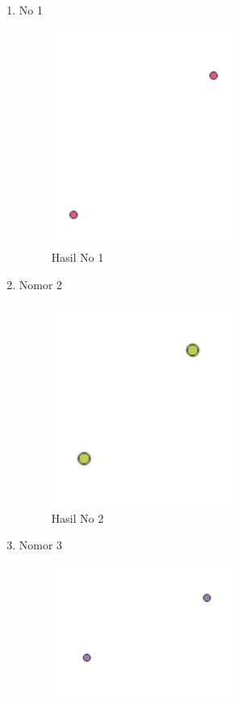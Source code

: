 \begin{enumerate}
	\item No 1
	
	\begin{figure}[H]
		\includegraphics[width=6cm]{figures/1174057/alit1.PNG}
		\centering
		\caption{Hasil No 1}
	\end{figure}
	\item Nomor 2
	
	\begin{figure}[H]
		\includegraphics[width=6cm]{figures/1174057/alit2.PNG}
		\centering
		\caption{Hasil No 2}
	\end{figure}
	\item Nomor 3
	
	\begin{figure}[H]
		\includegraphics[width=6cm]{figures/1174057/alit3.PNG}

\end{figure}
\end{enumerate}
